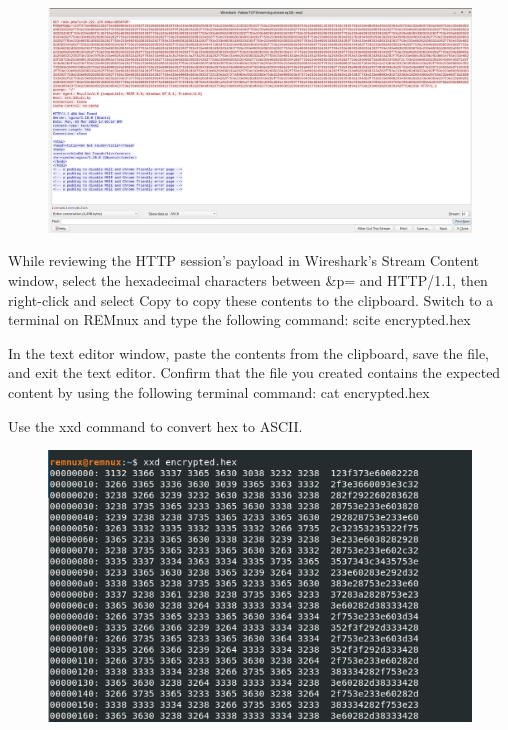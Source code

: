 \documentclass[]{project_plan}
\begin{document}
\begin{figure}[H]
  \centering
  \includegraphics[width=\linewidth]{brb wireshark payload.png}
\end{figure}

While reviewing the HTTP session’s payload in Wireshark’s Stream Content
window, select the hexadecimal characters between \&p= and HTTP/1.1, then
right-click and select Copy to copy these contents to the clipboard. Switch to
a terminal on REMnux and type the following command:
scite encrypted.hex

In the text editor window, paste the contents from the clipboard, save the
file, and exit the text editor. Confirm that the file you created contains the
expected content by using the following terminal command:
cat encrypted.hex

Use the xxd command to convert hex to ASCII.

\begin{figure}[H]
  \centering
  \includegraphics[width=\linewidth]{xxd.png}
\end{figure}
\end{document}

